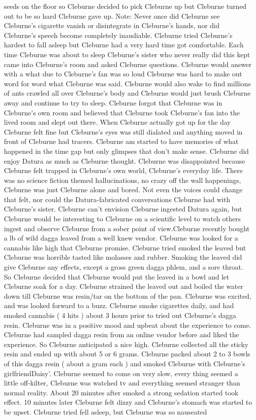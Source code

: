 \documentclass[12pt]{book}
\begin{document}
seeds on the floor so Cleburne decided to pick Cleburne up but Cleburne turned out to be so hard Cleburne gave up. Note: Never once did Cleburne see Cleburne's cigarette vanish or disintegrate in Cleburne's hands, nor did Cleburne's speech become completely inaudiable. Cleburne tried Cleburne's hardest to fall asleep but Cleburne had a very hard time got comfortable. Each time Cleburne was about to sleep Cleburne's sister who never really did this kept came into Cleburne's room and asked Cleburne questions. Cleburne would answer with a what due to Cleburne's fan was so loud Cleburne was hard to make out word for word what Cleburne was said. Cleburne would also wake to find millions of ants crawled all over Cleburne's body and Cleburne would just brush Cleburne away and continue to try to sleep. Cleburne forgot that Cleburne was in Cleburne's own room and believed that Cleburne took Cleburne's fan into the lived room and slept out there. When Cleburne actually got up for the day Cleburne felt fine but Cleburne's eyes was still dialated and anything moved in front of Cleburne had tracers. Cleburne am started to have memories of what happened in the time gap but only glimpses that don't make sense. Cleburne did enjoy Datura as much as Cleburne thought. Cleburne was disappointed because Cleburne felt trapped in Cleburne's own world, Cleburne's everyday life. There was no science fiction themed hallucinations, no crazy off the wall happenings, Cleburne was just Cleburne alone and bored. Not even the voices could change that felt, nor could the Datura-fabricated conversations Cleburne had with Cleburne's sister. Cleburne can't envision Cleburne ingested Datura again, but Cleburne would be interesting to Cleburne on a scientific level to watch others ingest and observe Cleburne from a sober point of view.Cleburne recently bought a lb of wild dagga leaved from a well knew vendor. Cleburne was looked for a cannabis like high that Cleburne promise. Cleburne tried smoked the leaved but Cleburne was horrible tasted like molasses and rubber. Smoking the leaved did give Cleburne any effects, except a gross green dagga phlem, and a sore throat. So Cleburne decided that Cleburne would put the leaved in a bowl and let Cleburne soak for a day. Cleburne strained the leaved out and boiled the water down till Cleburne was resin/tar on the bottom of the pan. Cleburne was excited, and was looked forward to a buzz. Cleburne smoke cigarettes daily, and had smoked cannabis ( 4 hits ) about 3 hours prior to tried out Cleburne's dagga resin. Cleburne was in a positive mood and upbeat about the experience to come. Cleburne had sampled dagga resin from an online vendor before and liked the experience. So Cleburne anticipated a nice high. Cleburne collected all the sticky resin and ended up with about 5 or 6 grams. Cleburne packed about 2 to 3 bowls of this dagga resin ( about a gram each ) and smoked Cleburne with Cleburne's girlfriendDaisy'. Cleburne seemed to come on very slow, every thing seemed a little off-kilter, Cleburne was watched tv and everything seemed stranger than normal reality. About 20 minutes after smoked a strong sedation started took effect. 10 minutes later Cleburne felt dizzy and Cleburne's stomach was started to be upset. Cleburne tried fell asleep, but Cleburne was so nauseated 
\end{document}
